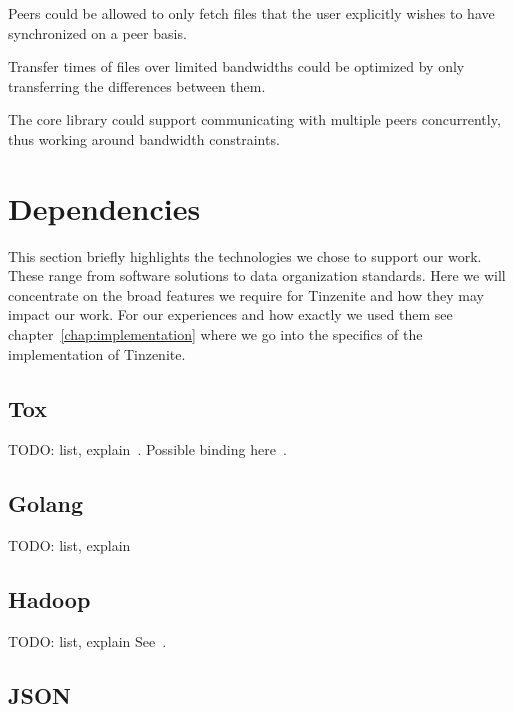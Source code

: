 \begin{description}[leftmargin=7.5em,style=nextline,noitemsep,nolistsep]
\item[Shadow Files]
    Peers could be allowed to only fetch files that the user explicitly wishes to have synchronized on a peer basis.
\item[Delta Updates]
    Transfer times of files over limited bandwidths could be optimized by only transferring the differences between them.
\item[Concurrency]
    The core library could support communicating with multiple peers concurrently, thus working around bandwidth constraints.
\end{description}

\section{Dependencies}
\label{sec:Dependencies}

This section briefly highlights the technologies we chose to support our work.
These range from software solutions to data organization standards.
Here we will concentrate on the broad features we require for Tinzenite and how they may impact our work.
For our experiences and how exactly we used them see chapter~\ref{chap:implementation} where we go into the specifics of the implementation of Tinzenite.

\subsection{Tox}

TODO: list, explain~\cite{web:site:tox}.
Possible binding here~\cite{web:site:tox:golang}.

\subsection{Golang}

TODO: list, explain

\subsection{Hadoop}

TODO: list, explain
See~\cite{web:site:hadoop}.

\subsection{JSON}

